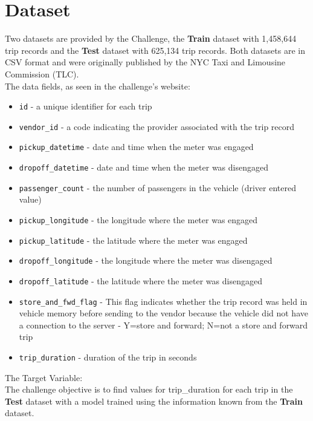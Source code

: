 \documentclass[11pt]{article}
\begin{document}
\section{Dataset}

\hspace{0.5cm}Two datasets are provided by the Challenge, the \textbf{Train} dataset with 1,458,644 trip records and the \textbf{Test} dataset with 625,134 trip records. Both datasets are in CSV format and were originally published by the NYC Taxi and Limousine Commission (TLC)\cite{challenge_site}.\\

\noindent The data fields, as seen in the challenge's website:

\begin{itemize}
\item \texttt{id} - a unique identifier for each trip
\item \texttt{vendor\_id} - a code indicating the provider associated with the trip record
\item \texttt{pickup\_datetime} - date and time when the meter was engaged
\item \texttt{dropoff\_datetime} - date and time when the meter was disengaged
\item \texttt{passenger\_count} - the number of passengers in the vehicle (driver entered value)
\item \texttt{pickup\_longitude} - the longitude where the meter was engaged
\item \texttt{pickup\_latitude} - the latitude where the meter was engaged
\item \texttt{dropoff\_longitude} - the longitude where the meter was disengaged
\item \texttt{dropoff\_latitude} - the latitude where the meter was disengaged
\item \texttt{store\_and\_fwd\_flag} - This flag indicates whether the trip record was held in vehicle memory before sending to the vendor because the vehicle did not have a connection to the server - Y=store and forward; N=not a store and forward trip
\item \texttt{{trip\_duration}} - duration of the trip in seconds
\end{itemize}

\noindent The Target Variable:\\

The challenge objective is to find values for trip\_duration for each trip in the \textbf{Test} dataset with a model trained using the information known from the \textbf{Train} dataset.
\end{document}
